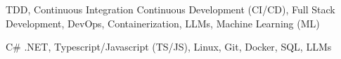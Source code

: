 

TDD, Continuous Integration Continuous Development (CI/CD), Full Stack Development, DevOps, Containerization, LLMs, Machine Learning (ML)

\vspace{1pc}

C\# .NET, Typescript/Javascript (TS/JS), Linux, Git, Docker, SQL, LLMs

\vspace{1pc}